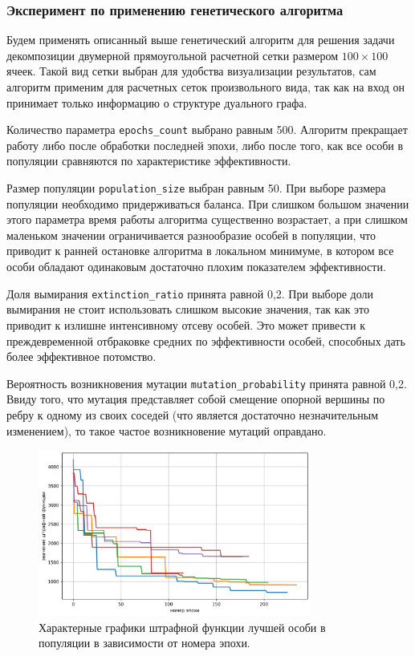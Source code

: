 \subsubsection{Эксперимент по применению генетического алгоритма}

Будем применять описанный выше генетический алгоритм для решения задачи декомпозиции двумерной прямоугольной расчетной сетки размером $100 \times 100$ ячеек.
Такой вид сетки выбран для удобства визуализации результатов, сам алгоритм применим для расчетных сеток произвольного вида, так как на вход он принимает только информацию о структуре дуального графа.

Количество параметра \texttt{epochs\_count} выбрано равным 500.
Алгоритм прекращает работу либо после обработки последней эпохи, либо после того, как все особи в популяции сравняются по характеристике эффективности.

Размер популяции \texttt{population\_size} выбран равным 50.
При выборе размера популяции необходимо придерживаться баланса.
При слишком большом значении этого параметра время работы алгоритма существенно возрастает, а при слишком маленьком значении ограничивается разнообразие особей в популяции, что приводит к ранней остановке алгоритма в локальном минимуме, в котором все особи обладают одинаковым достаточно плохим показателем эффективности.

Доля вымирания \texttt{extinction\_ratio} принята равной 0,2.
При выборе доли вымирания не стоит использовать слишком высокие значения, так как это приводит к излишне интенсивному отсеву особей.
Это может привести к преждевременной отбраковке средних по эффективности особей, способных дать более эффективное потомство.

Вероятность возникновения мутации \texttt{mutation\_probability} принята равной 0,2.
Ввиду того, что мутация представляет собой смещение опорной вершины по ребру к одному из своих соседей (что является достаточно незначительным изменением), то такое частое возникновение мутаций оправдано.

\begin{figure}[ht]
\centering
\includegraphics[width=0.8\textwidth]{./pics/text_2_genetic/chart1.png}
\singlespacing
{}\caption{Характерные графики штрафной функции лучшей особи в популяции в зависимости от номера эпохи.}
\label{fig:text_2_genetic_chart1}
\end{figure}

